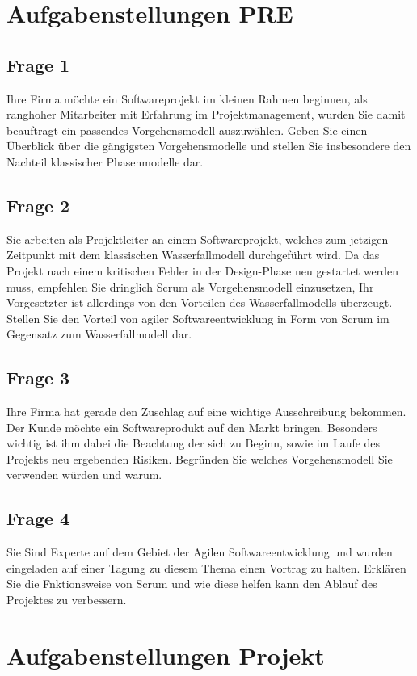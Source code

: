 \documentclass[a4paper, twopage]{scrreprt}
\begin{document}


\chapter{Aufgabenstellungen PRE}
\section{Frage 1}
Ihre Firma möchte ein Softwareprojekt im kleinen Rahmen beginnen, als ranghoher Mitarbeiter mit Erfahrung im Projektmanagement, wurden Sie damit beauftragt ein passendes Vorgehensmodell auszuwählen. Geben Sie einen Überblick über die gängigsten Vorgehensmodelle und stellen Sie insbesondere den Nachteil klassischer Phasenmodelle dar.
\section{Frage 2}
Sie arbeiten als Projektleiter an einem Softwareprojekt, welches zum jetzigen Zeitpunkt mit dem klassischen Wasserfallmodell durchgeführt wird. Da das Projekt nach einem kritischen Fehler in der Design-Phase neu gestartet werden muss, empfehlen Sie dringlich Scrum als Vorgehensmodell einzusetzen, Ihr Vorgesetzter ist allerdings von den Vorteilen des Wasserfallmodells überzeugt. Stellen Sie den Vorteil von agiler Softwareentwicklung in Form von Scrum im Gegensatz zum Wasserfallmodell dar.
\section{Frage 3}
Ihre Firma hat gerade den Zuschlag auf eine wichtige Ausschreibung bekommen. Der Kunde möchte ein Softwareprodukt auf den Markt bringen. Besonders wichtig ist ihm dabei die Beachtung der sich zu Beginn, sowie im Laufe des Projekts neu ergebenden Risiken. Begründen Sie welches Vorgehensmodell Sie verwenden würden und warum.
\section{Frage 4}
Sie Sind Experte auf dem Gebiet der Agilen Softwareentwicklung und wurden eingeladen auf einer Tagung zu diesem Thema einen Vortrag zu halten. Erklären Sie die Fnktionsweise von Scrum und wie diese helfen kann den Ablauf des Projektes zu verbessern.


\chapter{Aufgabenstellungen Projekt}
\end{document}
